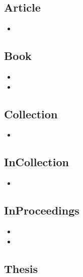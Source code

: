 \subsection{Article}

\begin{itemize}
\item {}
\end{itemize}

\subsection{Book}

\begin{itemize}
\item {}
\item {}
\end{itemize}

\subsection{Collection}

\begin{itemize}
\item {}
\end{itemize}

\subsection{InCollection}

\begin{itemize}
\item {}
\end{itemize}

\subsection{InProceedings}

\begin{itemize}
\item {}
\item {}
\end{itemize}

\subsection{Thesis}

